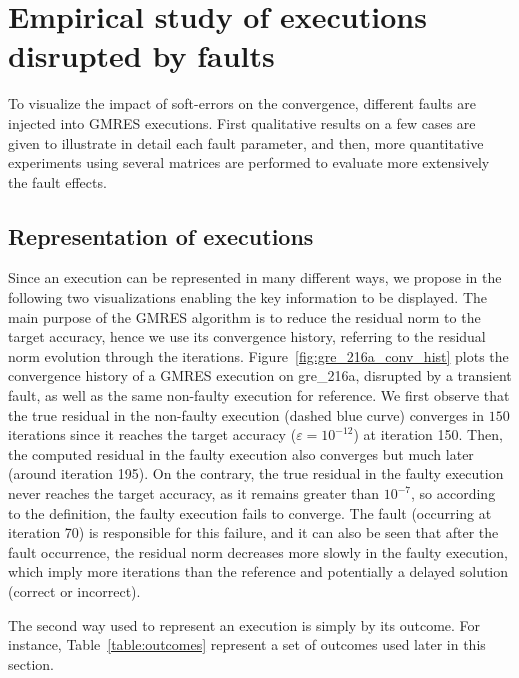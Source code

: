 \section{Empirical study of executions disrupted by faults}\label{sec:empirical}
To visualize the impact of soft-errors on the convergence, different faults are injected into GMRES executions. First qualitative results on a few cases are given to illustrate in detail each fault parameter, and then, more quantitative experiments  using several matrices are performed to evaluate more extensively the fault effects. 

\subsection{Representation of executions}
Since an execution can be represented in many different ways, we propose in the following two visualizations enabling the key information to be displayed. The main purpose of the GMRES algorithm is to reduce the residual norm to the target accuracy, hence we use its convergence history, referring to the residual norm evolution through the iterations. Figure~\ref{fig:gre_216a_conv_hist} plots the convergence history of a GMRES execution on gre_216a, disrupted by a transient fault, as well as the same non-faulty execution for reference. We first observe that the true residual in the non-faulty execution (dashed blue curve) converges in $150$ iterations since it reaches the target accuracy ($\varepsilon = 10^{-12}$) at iteration 150. Then, the computed residual in the faulty execution also converges but much later (around iteration 195). On the contrary, the true residual in the faulty execution never reaches the target accuracy, as it remains greater than $10^{-7}$, so according to the definition, the faulty execution fails to converge. The fault (occurring at iteration 70) is responsible for this failure, and it can also be seen that after the fault occurrence, the residual norm decreases more slowly in the faulty execution, which imply more iterations than the reference and potentially a delayed solution (correct or incorrect).

The second way used to represent an execution is simply by its outcome. For instance, Table~\ref{table:outcomes} represent a set of outcomes used later in this section.






